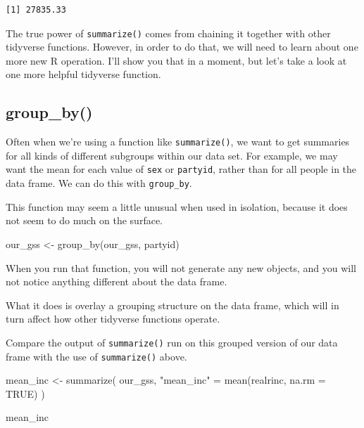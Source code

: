 \documentclass[
  letterpaper,
  DIV=11,
  numbers=noendperiod]{scrreprt}
\newenvironment{Shaded}{\begin{snugshade}}{\end{snugshade}}
\newcommand{\AttributeTok}[1]{\textcolor[rgb]{0.40,0.45,0.13}{#1}}
\newcommand{\ConstantTok}[1]{\textcolor[rgb]{0.56,0.35,0.01}{#1}}
\newcommand{\FunctionTok}[1]{\textcolor[rgb]{0.28,0.35,0.67}{#1}}
\newcommand{\NormalTok}[1]{\textcolor[rgb]{0.00,0.23,0.31}{#1}}
\newcommand{\OtherTok}[1]{\textcolor[rgb]{0.00,0.23,0.31}{#1}}
\newcommand{\StringTok}[1]{\textcolor[rgb]{0.13,0.47,0.30}{#1}}
\begin{document}
\begin{verbatim}
[1] 27835.33
\end{verbatim}

The true power of \texttt{summarize()} comes from chaining it together
with other tidyverse functions. However, in order to do that, we will
need to learn about one more new R operation. I'll show you that in a
moment, but let's take a look at one more helpful tidyverse function.

\subsection{group\_by()}\label{group_by}

Often when we're using a function like \texttt{summarize()}, we want to
get summaries for all kinds of different subgroups within our data set.
For example, we may want the mean for each value of \texttt{sex} or
\texttt{partyid}, rather than for all people in the data frame. We can
do this with \texttt{group\_by}.

This function may seem a little unusual when used in isolation, because
it does not seem to do much on the surface.

\begin{Shaded}
\begin{Highlighting}[]
\NormalTok{our\_gss }\OtherTok{\textless{}{-}} \FunctionTok{group\_by}\NormalTok{(our\_gss, partyid)}
\end{Highlighting}
\end{Shaded}

When you run that function, you will not generate any new objects, and
you will not notice anything different about the data frame.

What it does is overlay a grouping structure on the data frame, which
will in turn affect how other tidyverse functions operate.

Compare the output of \texttt{summarize()} run on this grouped version
of our data frame with the use of \texttt{summarize()} above.

\begin{Shaded}
\begin{Highlighting}[]
\NormalTok{mean\_inc }\OtherTok{\textless{}{-}} \FunctionTok{summarize}\NormalTok{(}
\NormalTok{  our\_gss,}
  \StringTok{"mean\_inc"} \OtherTok{=} \FunctionTok{mean}\NormalTok{(realrinc, }\AttributeTok{na.rm =} \ConstantTok{TRUE}\NormalTok{)}
\NormalTok{  )}

\NormalTok{mean\_inc}
\end{Highlighting}
\end{Shaded}
\end{document}
